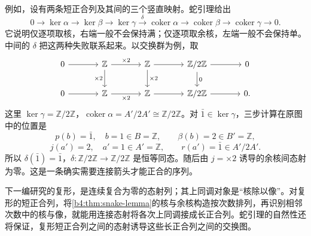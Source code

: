 \ProseParagraphBreak
例如，设有两条短正合列及其间的三个竖直映射。蛇引理给出
\[
	0\to\ker\alpha\to\ker\beta\to\ker\gamma \xrightarrow\delta\operatorname{coker}\alpha \to\operatorname{coker}\beta\to\operatorname{coker}\gamma\to0.
\]
它说明仅逐项取核，右端一般不会保持满；仅逐项取余核，左端一般不会保持单。中间的 \(\delta\) 把这两种失败联系起来。以交换群为例，取
\[
	\begin{tikzcd}[column sep=large]
		0\arrow[r]&\mathbb Z\arrow[r,"\times2"]\arrow[d,"\times2"']&\mathbb Z\arrow[r]\arrow[d,"\times2"]&\mathbb Z/2\mathbb Z\arrow[r]\arrow[d,"0"]&0\\
		0\arrow[r]&\mathbb Z\arrow[r,"\times2"']&\mathbb Z\arrow[r]&\mathbb Z/2\mathbb Z\arrow[r]&0 .
	\end{tikzcd}
\]
这里 \(\ker\gamma=\mathbb Z/2\mathbb Z\)，\(\operatorname{coker}\alpha=A'/2A'\cong\mathbb Z/2\mathbb Z\)。对 \(\bar1\in\ker\gamma\)，三步计算在原图中的位置是
\[
	p(b)=\bar1,\quad b=1\in B=\mathbb Z,\qquad \beta(b)=2\in B'=\mathbb Z,
\]
\[
	j(a')=2,\quad a'=1\in A'=\mathbb Z,\qquad r(a')=\bar1\in A'/2A'.
\]
所以 \(\delta(\bar1)=\bar1\)，\(\delta:\mathbb Z/2\mathbb Z\to\mathbb Z/2\mathbb Z\) 是恒等同态。随后由 \(j=\times2\) 诱导的余核间态射为零。这是一条确实需要连接箭头才能正合的序列。

\ProseParagraphBreak
下一编研究的复形，是连续复合为零的态射列；其上同调对象是“核除以像”。对复形的短正合列，将\cref{b4:thm:snake-lemma}的核与余核构造按次数排列，再识别相邻次数中的核与像，就能用连接态射将各次上同调接成长正合列。蛇引理的自然性还将保证，复形短正合列之间的态射诱导这些长正合列之间的交换图。
